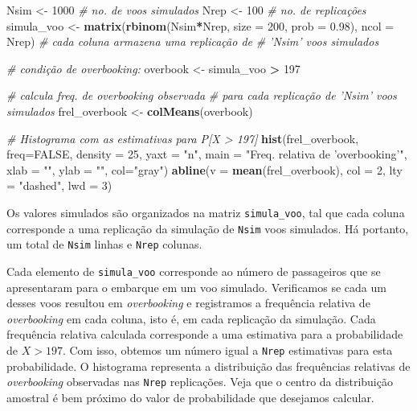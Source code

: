 \documentclass[
]{book}
\newenvironment{Shaded}{\begin{snugshade}}{\end{snugshade}}
\newcommand{\CommentTok}[1]{\textcolor[rgb]{0.56,0.35,0.01}{\textit{#1}}}
\newcommand{\DataTypeTok}[1]{\textcolor[rgb]{0.13,0.29,0.53}{#1}}
\newcommand{\DecValTok}[1]{\textcolor[rgb]{0.00,0.00,0.81}{#1}}
\newcommand{\FloatTok}[1]{\textcolor[rgb]{0.00,0.00,0.81}{#1}}
\newcommand{\KeywordTok}[1]{\textcolor[rgb]{0.13,0.29,0.53}{\textbf{#1}}}
\newcommand{\NormalTok}[1]{#1}
\newcommand{\OperatorTok}[1]{\textcolor[rgb]{0.81,0.36,0.00}{\textbf{#1}}}
\newcommand{\OtherTok}[1]{\textcolor[rgb]{0.56,0.35,0.01}{#1}}
\newcommand{\StringTok}[1]{\textcolor[rgb]{0.31,0.60,0.02}{#1}}
\theoremstyle{definition}
\theoremstyle{definition}
\theoremstyle{definition}
\theoremstyle{remark}
\begin{document}
\begin{Shaded}
\begin{Highlighting}[]
\NormalTok{Nsim <-}\StringTok{ }\DecValTok{1000} \CommentTok{# no. de voos simulados}
\NormalTok{Nrep <-}\StringTok{ }\DecValTok{100}  \CommentTok{# no. de replicações}
\NormalTok{simula_voo <-}\StringTok{ }\KeywordTok{matrix}\NormalTok{(}\KeywordTok{rbinom}\NormalTok{(Nsim}\OperatorTok{*}\NormalTok{Nrep, }\DataTypeTok{size =} \DecValTok{200}\NormalTok{, }\DataTypeTok{prob =} \FloatTok{0.98}\NormalTok{),}
                     \DataTypeTok{ncol =}\NormalTok{ Nrep)}
              \CommentTok{# cada coluna armazena uma replicação de}
              \CommentTok{# 'Nsim' voos simulados}

\CommentTok{# condição de overbooking:}
\NormalTok{overbook <-}\StringTok{ }\NormalTok{simula_voo }\OperatorTok{>}\StringTok{ }\DecValTok{197}

\CommentTok{# calcula freq. de overbooking observada}
\CommentTok{# para cada replicação de 'Nsim' voos simulados}
\NormalTok{frel_overbook <-}\StringTok{ }\KeywordTok{colMeans}\NormalTok{(overbook) }

\CommentTok{# Histograma com as estimativas para P[X > 197]}
\KeywordTok{hist}\NormalTok{(frel_overbook, }\DataTypeTok{freq=}\OtherTok{FALSE}\NormalTok{,}
     \DataTypeTok{density =} \DecValTok{25}\NormalTok{,}
     \DataTypeTok{yaxt =} \StringTok{"n"}\NormalTok{,}
     \DataTypeTok{main =} \StringTok{"Freq. relativa de 'overbooking'"}\NormalTok{, }
     \DataTypeTok{xlab =} \StringTok{""}\NormalTok{, }\DataTypeTok{ylab =} \StringTok{""}\NormalTok{,}
     \DataTypeTok{col=}\StringTok{"gray"}\NormalTok{)}
\KeywordTok{abline}\NormalTok{(}\DataTypeTok{v =} \KeywordTok{mean}\NormalTok{(frel_overbook), }\DataTypeTok{col =} \DecValTok{2}\NormalTok{, }\DataTypeTok{lty =} \StringTok{"dashed"}\NormalTok{, }\DataTypeTok{lwd =} \DecValTok{3}\NormalTok{)}
\end{Highlighting}
\end{Shaded}

Os valores simulados são organizados na matriz \texttt{simula\_voo}, tal que cada coluna corresponde a uma replicação da simulação de \texttt{Nsim} voos simulados. Há portanto, um total de \texttt{Nsim} linhas e \texttt{Nrep} colunas.

Cada elemento de \texttt{simula\_voo} corresponde ao número de passageiros que se apresentaram para o embarque em um voo simulado. Verificamos se cada um desses voos resultou em \emph{overbooking} e registramos a frequência relativa de \emph{overbooking} em cada coluna, isto é, em cada replicação da simulação. Cada frequência relativa calculada corresponde a uma estimativa para a probabilidade de \(X > 197\). Com isso, obtemos um número igual a \texttt{Nrep} estimativas para esta probabilidade. O histograma representa a distribuição das frequências relativas de \emph{overbooking} observadas nas \texttt{Nrep} replicações. Veja que o centro da distribuição amostral é bem próximo do valor de probabilidade que desejamos calcular.
\end{document}
